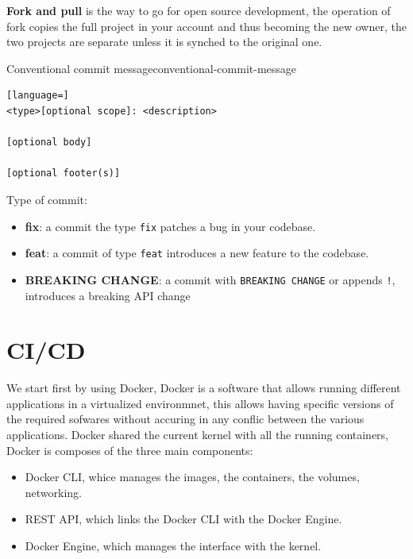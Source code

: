 \documentclass[12pt]{article}
\begin{document}
\textbf{Fork and pull} is the way to go for open source development, the operation of fork copies the full project in your account and thus becoming the new owner, the two projects are separate unless it is synched to the original one.
\begin{definition}{Conventional commit message}{conventional-commit-message}
\begin{lstlisting}[language=]
<type>[optional scope]: <description>

[optional body]

[optional footer(s)]
\end{lstlisting}
  Type of commit: 
  \begin{itemize}
    \item \textbf{fix}: a commit the type \texttt{fix} patches a bug in your codebase.
    \item \textbf{feat}: a commit of type \texttt{feat} introduces a new feature to the codebase.
    \item \textbf{BREAKING CHANGE}: a commit with \texttt{BREAKING CHANGE} or appends \texttt{!}, introduces a breaking API change
  \end{itemize}
\end{definition}


\newpage
\section{CI/CD}
We start first by using Docker, Docker is a software that allows running different applications in a virtualized environmnet, this allows having specific versions of the required sofwares without accuring in any conflic between the various applications. Docker shared the current kernel with all the running containers, Docker is composes of the three main components:
\begin{itemize}
  \item Docker CLI, whice manages the images, the containers, the volumes, networking.
  \item REST API, which links the Docker CLI with the Docker Engine.
  \item Docker Engine, which manages the interface with the kernel.
\end{itemize}





\newpage
\end{document}
